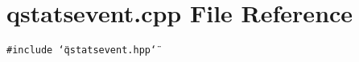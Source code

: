 \section{qstatsevent.cpp File Reference}
\label{qstatsevent_8cpp}
{\tt \#include \char`\"{}qstatsevent.hpp\char`\"{}}\par
